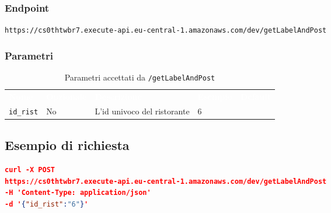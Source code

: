 \subsubsection{Endpoint}
\texttt{https://cs0thtwbr7.execute-api.eu-central-1.amazonaws.com/dev/getLabelAndPost}

\subsubsection{Parametri}
\begin{table}[!htbp]
\renewcommand{\arraystretch}{1.5}

\begin{tabular}[t]{ m{}<{\centering}  m{}<{\centering} m{}<{\centering} m{}<{\centering}  m{}<{\centering} }
	\rowcolor{darkblue}
	\textcolor{white}{\textbf{Nome}} &\textcolor{white}{\textbf{Opzionale}} &\textcolor{white}{\textbf{Descrizione}} &\textcolor{white}{\textbf{Esempio}} &\textcolor{white}{\textbf{Default}} \\ 
\texttt{id\_rist} & No & L'id univoco del ristorante  & 6 &  \\

\end{tabular}
\caption{Parametri accettati da \texttt{/getLabelAndPost}}
\end{table}

\subsection{Esempio di richiesta}
\begin{lstlisting}[language=json]
curl -X POST 
https://cs0thtwbr7.execute-api.eu-central-1.amazonaws.com/dev/getLabelAndPost
-H 'Content-Type: application/json'
-d '{"id_rist":"6"}'

\end{lstlisting}

\pagebreak


